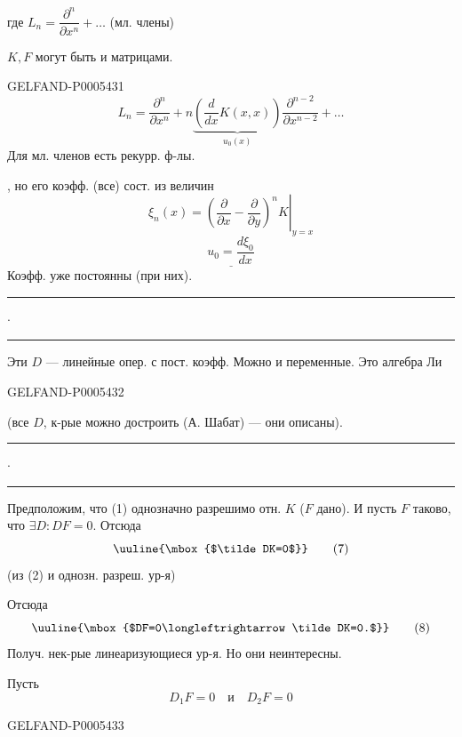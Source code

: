 где \(L_n=\dfrac{\partial^n}{\partial x^n}+\ldots\) (мл. члены)

\(K,F\) могут быть и матрицами.


\begin{GelfandAdjacentEvidence}{GELFAND-P000543}{1}
\[
L_n=\frac{\partial^n}{\partial x^n}
+n\underbrace{\left(\frac d{dx}K(x,x)\right)}_{u_0(x)}
\frac{\partial^{n-2}}{\partial x^{n-2}}+\ldots\tag{6}
\]
Для мл. членов есть рекурр. ф-лы.

, но его коэфф. (все) сост. из величин
\[
\xi_n(x)=\left.\left(\frac{\partial}{\partial x}-
\frac{\partial}{\partial y}\right)^n K\right|_{y=x}
\]
\[
\underline{u_0=\frac{d\xi_0}{dx}}
\]
Коэфф. уже постоянны (при них).

\hfill\rule{1.05cm}{.35pt}\enspace\(\cdot\)\enspace\rule{1.45cm}{.35pt}\par

Эти \(D\) — линейные опер. с пост. коэфф. Можно и переменные. Это алгебра Ли
\end{GelfandAdjacentEvidence}
\begin{GelfandAdjacentEvidence}{GELFAND-P000543}{2}

(все \(D\), к-рые можно достроить (А. Шабат) — они описаны).
\hfill\rule{1.05cm}{.35pt}\enspace\(\cdot\)\enspace\rule{1.45cm}{.35pt}\par

Предположим, что (1) однозначно разрешимо отн. \(K\) (\(F\) дано).
И пусть \(F\) таково, что \(\exists D\colon DF=0\). Отсюда
\[
\uuline{\mbox{$\tilde DK=0$}}\tag{7}
\]
(из (2) и однозн. разреш. ур-я)

Отсюда
\[
\uuline{\mbox{$DF=0\longleftrightarrow\tilde DK=0.$}}\tag{8}
\]
Получ. нек-рые линеаризующиеся ур-я. Но они неинтересны.

Пусть
\[
D_1F=0\quad\text{и}\quad D_2F=0\tag{9}
\]
\end{GelfandAdjacentEvidence}
\begin{GelfandAdjacentEvidence}{GELFAND-P000543}{3}

\end{GelfandAdjacentEvidence}
